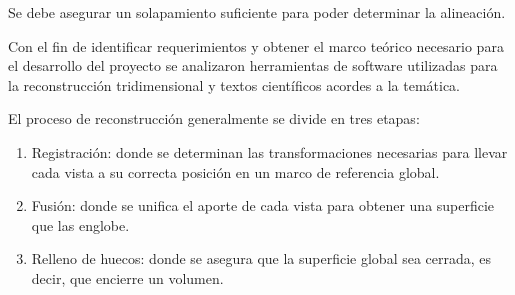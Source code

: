 	Se debe asegurar un solapamiento suficiente para poder determinar la alineación.








	Con el fin de identificar requerimientos y obtener el marco teórico
	necesario para el desarrollo del proyecto se analizaron herramientas de
	software utilizadas para la reconstrucción tridimensional y textos
	científicos acordes a la temática.

	El proceso de reconstrucción generalmente se divide en tres etapas:
	\begin{enumerate}
		\item Registración: donde se determinan las transformaciones necesarias
			para llevar cada vista a su correcta posición en un marco de
			referencia global.
		\item Fusión: donde se unifica el aporte de cada vista para obtener una
			superficie que las englobe.
		\item Relleno de huecos: donde se asegura que la superficie global sea
			cerrada, es decir, que encierre un volumen.
	\end{enumerate}





